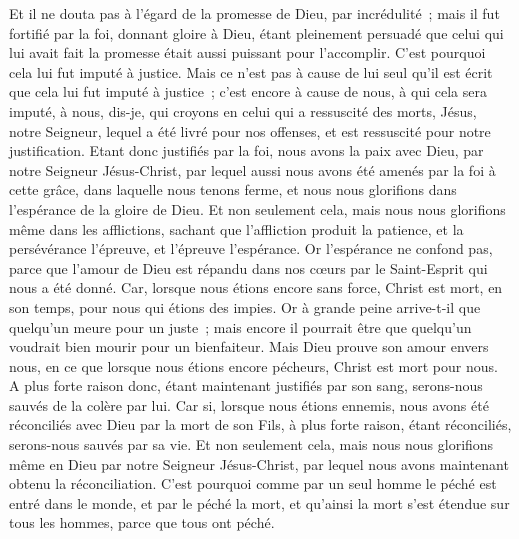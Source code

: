 \begin{multicols}{2}
Et il ne douta pas à l'égard de la promesse de Dieu, par incrédulité~; mais il fut fortifié par la foi, donnant gloire à Dieu,
étant pleinement persuadé que celui qui lui avait fait la promesse était aussi puissant pour l'accomplir.
C'est pourquoi cela lui fut imputé à justice.
Mais ce n'est pas à cause de lui seul qu'il est écrit que cela lui fut imputé à justice~;
c'est encore à cause de nous, à qui cela sera imputé, à nous, dis-je, qui croyons en celui qui a ressuscité des morts, Jésus, notre Seigneur,
lequel a été livré pour nos offenses, et est ressuscité pour notre justification.
\VerseOne{}Etant donc justifiés par la foi, nous avons la paix avec Dieu, par notre Seigneur Jésus-Christ,
par lequel aussi nous avons été amenés par la foi à cette grâce, dans laquelle nous tenons ferme, et nous nous glorifions dans l'espérance de la gloire de Dieu.
Et non seulement cela, mais nous nous glorifions même dans les afflictions, sachant que l'affliction produit la patience,
et la persévérance l'épreuve, et l'épreuve l'espérance.
Or l'espérance ne confond pas, parce que l'amour de Dieu est répandu dans nos cœurs par le Saint-Esprit qui nous a été donné.
Car, lorsque nous étions encore sans force, Christ est mort, en son temps, pour nous qui étions des impies.
Or à grande peine arrive-t-il que quelqu'un meure pour un juste~; mais encore il pourrait être que quelqu'un voudrait bien mourir pour un bienfaiteur.
Mais Dieu prouve son amour envers nous, en ce que lorsque nous étions encore pécheurs, Christ est mort pour nous.
A plus forte raison donc, étant maintenant justifiés par son sang, serons-nous sauvés de la colère par lui.
Car si, lorsque nous étions ennemis, nous avons été réconciliés avec Dieu par la mort de son Fils, à plus forte raison, étant réconciliés, serons-nous sauvés par sa vie.
Et non seulement cela, mais nous nous glorifions même en Dieu par notre Seigneur Jésus-Christ, par lequel nous avons maintenant obtenu la réconciliation.
C'est pourquoi comme par un seul homme le péché est entré dans le monde, et par le péché la mort, et qu'ainsi la mort s'est étendue sur tous les hommes, parce que tous ont péché.

\end{multicols}
